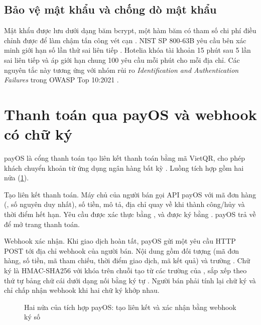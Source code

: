 \subsection{Bảo vệ mật khẩu và chống dò mật khẩu}

Mật khẩu được lưu dưới dạng băm bcrypt, một hàm băm có tham số chi phí điều chỉnh được để làm chậm tấn công vét cạn \cite{provos1999}. NIST SP 800-63B yêu cầu bên xác minh giới hạn số lần thử sai liên tiếp \cite{nist80063b}. Hotelia khóa tài khoản 15 phút sau 5 lần sai liên tiếp và áp giới hạn chung 100 yêu cầu mỗi phút cho mỗi địa chỉ. Các nguyên tắc này tương ứng với nhóm rủi ro \emph{Identification and Authentication Failures} trong OWASP Top 10:2021 \cite{owasptop10}.

\section{Thanh toán qua payOS và webhook có chữ ký}\label{sec:payos-theory}

payOS là cổng thanh toán tạo liên kết thanh toán bằng mã VietQR, cho phép khách chuyển khoản từ ứng dụng ngân hàng bất kỳ \cite{payosdocs}. Luồng tích hợp gồm hai nửa (\cref{fig:payos-theory}).

Tạo liên kết thanh toán. Máy chủ của người bán gọi API payOS với mã đơn hàng (, số nguyên duy nhất), số tiền, mô tả, địa chỉ quay về khi thành công/hủy và thời điểm hết hạn. Yêu cầu được xác thực bằng ,  và được ký bằng . payOS trả về  để mở trang thanh toán.

Webhook xác nhận. Khi giao dịch hoàn tất, payOS gửi một yêu cầu HTTP POST tới địa chỉ webhook của người bán. Nội dung gồm đối tượng  (mã đơn hàng, số tiền, mã tham chiếu, thời điểm giao dịch, mã kết quả) và trường . Chữ ký là HMAC-SHA256 với khóa  trên chuỗi tạo từ các trường của , sắp xếp theo thứ tự bảng chữ cái dưới dạng  nối bằng ký tự \code{\&} \cite{payosdocs,payosnode}. Người bán phải tính lại chữ ký và chỉ chấp nhận webhook khi hai chữ ký khớp nhau.

\begin{figure}[H]
\centering
{}
\caption{Hai nửa của tích hợp payOS: tạo liên kết và xác nhận bằng webhook ký số}\label{fig:payos-theory}
\end{figure}

